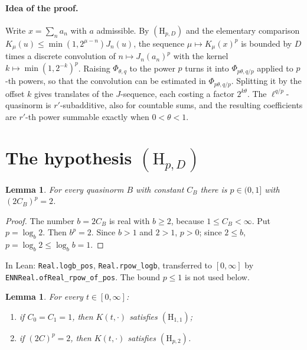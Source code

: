 \documentclass[11pt]{article}
\newtheorem{lemma}[theorem]{Lemma}
\theoremstyle{definition}
\theoremstyle{remark}
\begin{document}
\paragraph{Idea of the proof.}
Write \(x = \sum_n a_n\) with \(a\) admissible. By \((\mathrm H_{p,D})\) and the elementary
comparison \(K_\mu(u) \le \min(1,2^{\mu-n})J_n(u)\), the sequence \(\mu \mapsto K_\mu(x)^p\) is
bounded by \(D\) times a discrete convolution of \(n \mapsto J_n(a_n)^p\) with the kernel
\(k \mapsto \min(1,2^{-k})^p\). Raising \(\Phi_{\theta,q}\) to the power \(p\) turns it into
\(\Phi_{p\theta,q/p}\) applied to \(p\)-th powers, so that the convolution can be estimated in
\(\Phi_{p\theta,q/p}\). Splitting it by the offset \(k\) gives translates of the \(J\)-sequence,
each costing a factor \(2^{k\theta}\). The \(\ell^{q/p}\)-quasinorm is
\(r'\)-subadditive, also for countable sums, and the resulting coefficients are
\(r'\)-th power summable exactly when \(0 < \theta < 1\).

\section{The hypothesis \texorpdfstring{\((\mathrm H_{p,D})\)}{(H)}}

\begin{lemma}\label{lem:exponent}
  For every quasinorm \(B\) with constant \(C_B\) there is \(p \in (0,1]\) with
  \((2C_B)^p = 2\).
\end{lemma}

\begin{proof}
  The number \(b = 2C_B\) is real with \(b \ge 2\), because \(1 \le C_B < \infty\). Put
  \(p = \log_b 2\). Then \(b^p = 2\). Since \(b > 1\) and \(2 > 1\), \(p > 0\); since
  \(2 \le b\), \(p = \log_b 2 \le \log_b b = 1\).
\end{proof}

In Lean: \texttt{Real.logb\_pos}, \texttt{Real.rpow\_logb}, transferred to \([0,\infty]\) by
\texttt{ENNReal.ofReal\_rpow\_of\_pos}. The bound \(p \le 1\) is not used below.

\begin{lemma}\label{lem:H}
  For every \(t \in [0,\infty]\):
  \begin{enumerate}
    \item[(a)] if \(C_0 = C_1 = 1\), then \(K(t,\cdot)\) satisfies \((\mathrm H_{1,1})\);
    \item[(b)] if \((2C)^p = 2\), then \(K(t,\cdot)\) satisfies \((\mathrm H_{p,2})\).
  \end{enumerate}
\end{lemma}
\end{document}
